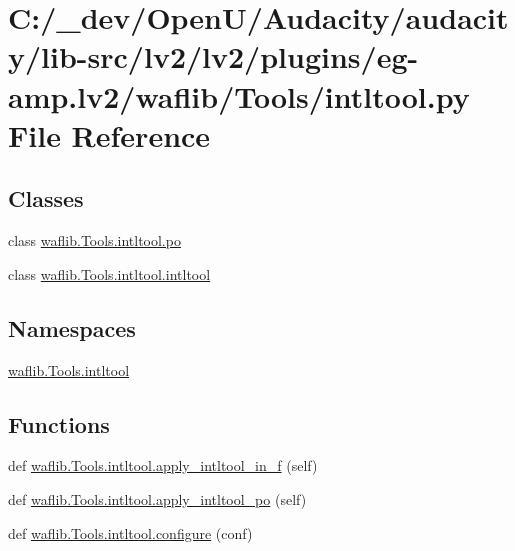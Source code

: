 \hypertarget{lv2_2plugins_2eg-amp_8lv2_2waflib_2_tools_2intltool_8py}{}\section{C\+:/\+\_\+dev/\+Open\+U/\+Audacity/audacity/lib-\/src/lv2/lv2/plugins/eg-\/amp.lv2/waflib/\+Tools/intltool.py File Reference}
\label{lv2_2plugins_2eg-amp_8lv2_2waflib_2_tools_2intltool_8py}
\subsection*{Classes}
\begin{DoxyCompactItemize}
\item 
class \hyperlink{classwaflib_1_1_tools_1_1intltool_1_1po}{waflib.\+Tools.\+intltool.\+po}
\item 
class \hyperlink{classwaflib_1_1_tools_1_1intltool_1_1intltool}{waflib.\+Tools.\+intltool.\+intltool}
\end{DoxyCompactItemize}
\subsection*{Namespaces}
\begin{DoxyCompactItemize}
\item 
 \hyperlink{namespacewaflib_1_1_tools_1_1intltool}{waflib.\+Tools.\+intltool}
\end{DoxyCompactItemize}
\subsection*{Functions}
\begin{DoxyCompactItemize}
\item 
def \hyperlink{namespacewaflib_1_1_tools_1_1intltool_aa64909ee30db7f6c262eb9c6bacc5f08}{waflib.\+Tools.\+intltool.\+apply\+\_\+intltool\+\_\+in\+\_\+f} (self)
\item 
def \hyperlink{namespacewaflib_1_1_tools_1_1intltool_a8e47eb8e5671c4d3f18cdb788a5868b6}{waflib.\+Tools.\+intltool.\+apply\+\_\+intltool\+\_\+po} (self)
\item 
def \hyperlink{namespacewaflib_1_1_tools_1_1intltool_a6e857d8fd69986194be76352936c4db1}{waflib.\+Tools.\+intltool.\+configure} (conf)
\end{DoxyCompactItemize}
